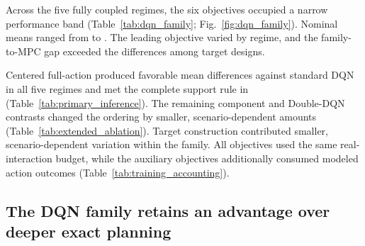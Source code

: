 \documentclass[11pt]{article}
\begin{document}
\begin{table}[H]
\centering
\caption{Paired inference for centered full-action minus standard DQN across the five fully coupled regimes. Negative differences favor centered full-action supervision. Each comparison uses 20 model-seed blocks after averaging 20 shared held-out traces. Holm adjustment covers the five prespecified regimes, and LOO denotes the leave-one-seed-out mean range.}
\label{tab:primary_inference}
\resizebox{\textwidth}{!}{}
\end{table}

\begin{table}[H]
\centering
\caption{Training information and computation accounting. Wall time is mean $\pm$ SD across 20 models. ``Modeled action outcomes'' counts analytical action evaluations used by the learning objective. Information and computational budgets additionally reflect these modeled action outcomes.}
\label{tab:training_accounting}
\resizebox{0.92\textwidth}{!}{}
\end{table}

Across the five fully coupled regimes, the six objectives occupied a narrow performance band (Table~\ref{tab:dqn_family}; Fig.~\ref{fig:dqn_family}). Nominal means ranged from \DQNFamilyNominalMinCost{} to \DQNFamilyNominalMaxCost. The leading objective varied by regime, and the family-to-MPC gap exceeded the differences among target designs.

Centered full-action produced favorable mean differences against standard DQN in all five regimes and met the complete support rule in \PrimarySupportedCount{} (Table~\ref{tab:primary_inference}). The remaining component and Double-DQN contrasts changed the ordering by smaller, scenario-dependent amounts (Table~\ref{tab:extended_ablation}). Target construction contributed smaller, scenario-dependent variation within the family. All objectives used the same real-interaction budget, while the auxiliary objectives additionally consumed modeled action outcomes (Table~\ref{tab:training_accounting}).

\subsection{The DQN family retains an advantage over deeper exact planning}

\begin{table}[H]
\centering
\caption{Nominal receding-horizon planning over 400 unique held-out traces. Each planner has perfect knowledge of the next $H$ tasks and exogenous link states and exactly enumerates $3^H$ sequences before every action. Runtime was measured on the same workstation and includes only planner action selection after environment construction. DQN inference time was not benchmarked in this experiment, so the table is not a matched deployment-latency comparison.}
\label{tab:planner_depth}
\resizebox{0.85\textwidth}{!}{}
\end{table}
\end{document}
